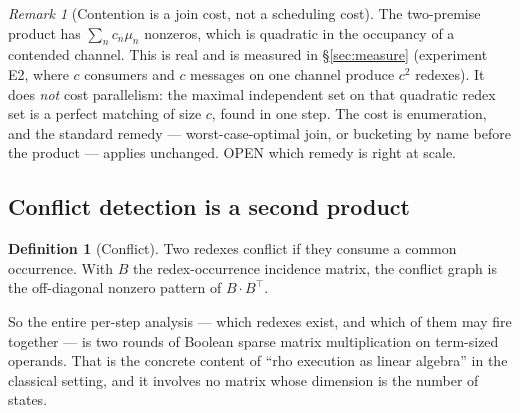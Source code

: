 \documentclass[11pt,a4paper]{article}
\theoremstyle{plain}
\theoremstyle{definition}
\newtheorem{definition}[theorem]{Definition}
\theoremstyle{remark}
\newtheorem{remark}[theorem]{Remark}
\newcommand{\rhoc}{\textsf{rho}}
\begin{document}
\begin{remark}[Contention is a join cost, not a scheduling cost]
\label{rem:contention}
The two-premise product has $\sum_n c_n \mu_n$ nonzeros, which is quadratic in
the occupancy of a contended channel. This is real and is measured in
\S\ref{sec:measure} (experiment E2, where $c$ consumers and $c$ messages on
one channel produce $c^{2}$ redexes). It does \emph{not} cost parallelism:
the maximal independent set on that quadratic redex set is a perfect matching
of size $c$, found in one step. The cost is enumeration, and the standard
remedy --- worst-case-optimal join, or bucketing by name before the product ---
applies unchanged. \textsf{OPEN} which remedy is right at scale.
\end{remark}

\subsection{Conflict detection is a second product}

\begin{definition}[Conflict]
Two redexes conflict if they consume a common occurrence. With $B$ the
redex-occurrence incidence matrix, the conflict graph is the off-diagonal
nonzero pattern of $B\cdot B^{\top}$.
\end{definition}

So the entire per-step analysis --- which redexes exist, and which of them may
fire together --- is two rounds of Boolean sparse matrix multiplication on
term-sized operands. That is the concrete content of ``\rhoc{} execution as
linear algebra'' in the classical setting, and it involves no matrix whose
dimension is the number of states.
\end{document}
